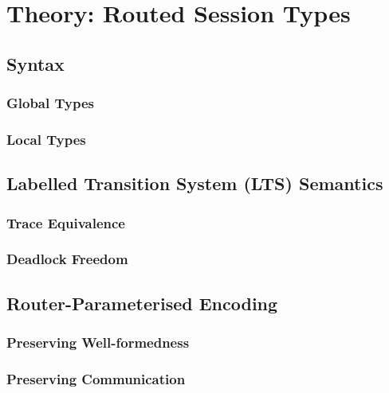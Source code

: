 \chapter{Theory: Routed Session Types}

\section{Syntax}

\subsection{Global Types}

\subsection{Local Types}

\section{Labelled Transition System (LTS) Semantics}

\subsection{Trace Equivalence}

\subsection{Deadlock Freedom}

\section{Router-Parameterised Encoding}

\subsection{Preserving Well-formedness}

\subsection{Preserving Communication}